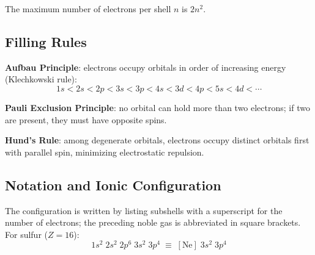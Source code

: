 \documentclass[a4paper,11pt]{article}
\begin{document}
The maximum number of electrons per shell $n$ is $2n^2$.

\subsection{Filling Rules}

\begin{definizione}
\textbf{Aufbau Principle}: electrons occupy orbitals in order of increasing energy (Klechkowski rule):
\[
1s < 2s < 2p < 3s < 3p < 4s < 3d < 4p < 5s < 4d < \cdots
\]
\end{definizione}

\begin{definizione}
\textbf{Pauli Exclusion Principle}: no orbital can hold more than two electrons; if two are present, they must have opposite spins.
\end{definizione}

\begin{definizione}
\textbf{Hund's Rule}: among degenerate orbitals, electrons occupy distinct orbitals first with parallel spin, minimizing electrostatic repulsion.
\end{definizione}

\subsection{Notation and Ionic Configuration}

The configuration is written by listing subshells with a superscript for the number of electrons; the preceding noble gas is abbreviated in square brackets. For sulfur ($Z=16$):
\[
1s^2\;2s^2\;2p^6\;3s^2\;3p^4 \;\equiv\; [\text{Ne}]\;3s^2\;3p^4
\]
\end{document}

